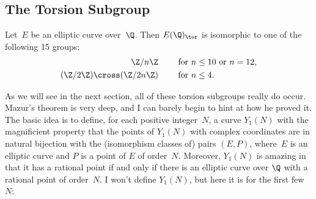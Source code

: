 \documentclass[11pt]{report}
\begin{document}
\subsection{The Torsion Subgroup}
\begin{theorem}
  Let~$E$ be an elliptic curve over~$\Q$.  Then $E(\Q)_{\tor}$ is
  isomorphic to one of the following 15 groups:
  \begin{align*}
    \Z/n\Z                   & \qquad\text{ for } n\leq 10 \text{ or } n=12, \\
    (\Z/2\Z)\cross (\Z/2n\Z) & \qquad \text{ for } n \leq 4.
  \end{align*}
\end{theorem}
As we will see in the next section, all of these torsion subgroups really
do occur.   Mazur's theorem is very deep, and I can barely begin to
hint at how he proved it.  The basic idea is to define, for each
positive integer~$N$, a curve $Y_1(N)$ with the
magnificient property that
the points of $Y_1(N)$ with complex coordinates are
in natural bijection with the (isomorphism classes of) pairs
$(E,P)$, where~$E$ is an elliptic curve and $P$ is a point
of $E$ of order~$N$. Moreover, $Y_1(N)$ is amazing in that
it has a rational point if and only if there is an elliptic curve
over $\Q$ with a rational point of order~$N$.  I won't
define $Y_1(N)$, but here it is for the first few~$N$:
\end{document}
